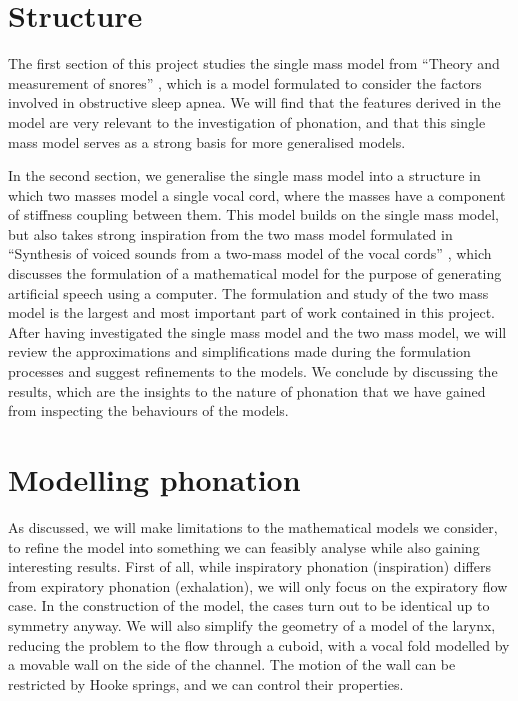 \documentclass{report}
\begin{document}
\section{Structure}

The first section of this project studies the single mass model from ``Theory and measurement of snores'' \cite{gavriely_jensen_1993},
which is a model formulated to consider the factors involved in obstructive sleep apnea.
We will find that the features derived in the model are very relevant to the investigation of phonation,
and that this single mass model serves as a strong basis for more generalised models.

In the second section, we generalise the single mass model into a structure in which two masses model a single vocal cord,
where the masses have a component of stiffness coupling between them.
This model builds on the single mass model,
but also takes strong inspiration from the two mass model formulated in ``Synthesis of voiced sounds from a two-mass model of the vocal cords'' \cite{ishizaka_flanagan_1972},
which discusses the formulation of a mathematical model for the purpose of generating artificial speech using a computer.
The formulation and study of the two mass model is the largest and most important part of work contained in this project.
After having investigated the single mass model and the two mass model,
we will review the approximations and simplifications made during the formulation processes and suggest refinements to the models.
We conclude by discussing the results, which are the insights to the nature of phonation that we have gained from inspecting the behaviours of the models.

\section{Modelling phonation}

As discussed, we will make limitations to the mathematical models we consider,
to refine the model into something we can feasibly analyse while also gaining interesting results.
First of all, while inspiratory phonation (inspiration) differs from expiratory phonation (exhalation),
we will only focus on the expiratory flow case.
In the construction of the model, the cases turn out to be identical up to symmetry anyway.
We will also simplify the geometry of a model of the larynx,
reducing the problem to the flow through a cuboid, with a vocal fold modelled by a movable wall on the side of the channel.
The motion of the wall can be restricted by Hooke springs, and we can control their properties.
\end{document}
